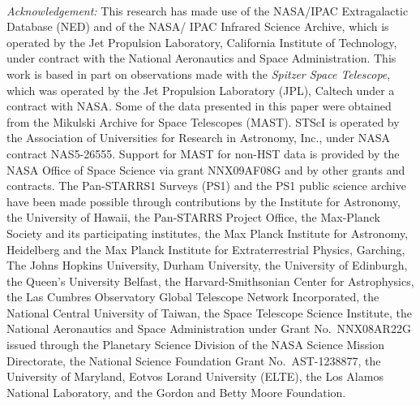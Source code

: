 \documentclass[mathleft,fleqn,%
]{an}
\begin{document}
~\\
{\it Acknowledgement: } 
This research has made use of the NASA/IPAC Extragalactic Database
(NED) and of the NASA/ IPAC Infrared Science Archive, which is
operated by the Jet Propulsion Laboratory, California 
Institute of Technology, under contract with the National Aeronautics
and Space Administration.  
This work is based in part on observations made with the {\it Spitzer
Space Telescope}, which was operated by the Jet Propulsion Laboratory
(JPL), Caltech under a contract with NASA. 
Some of the data presented in this paper were obtained from the
Mikulski Archive for Space Telescopes (MAST). STScI is operated by the
Association of Universities for Research in Astronomy, Inc., under
NASA contract NAS5-26555. Support for MAST for non-HST data is
provided by the NASA Office of Space Science via grant NNX09AF08G and
by other grants and contracts. 
%
The Pan-STARRS1 Surveys (PS1) and the PS1 public science archive have
been made possible through contributions by the Institute for Astronomy,
the University of Hawaii, the Pan-STARRS Project Office, the Max-Planck
Society and its participating institutes, the Max Planck Institute for
Astronomy, Heidelberg and the Max Planck Institute for Extraterrestrial
Physics, Garching, The Johns Hopkins University, Durham University, the
University of Edinburgh, the Queen's University Belfast, the
Harvard-Smithsonian Center for Astrophysics, the Las Cumbres Observatory
Global Telescope Network Incorporated, the National Central University
of Taiwan, the Space Telescope Science Institute, the National
Aeronautics and Space Administration under Grant No.\ NNX08AR22G issued
through the Planetary Science Division of the NASA Science Mission
Directorate, the National Science Foundation Grant No.\ AST-1238877, the
University of Maryland, Eotvos Lorand University (ELTE), the Los Alamos
National Laboratory, and the Gordon and Betty Moore Foundation.
\end{document}
